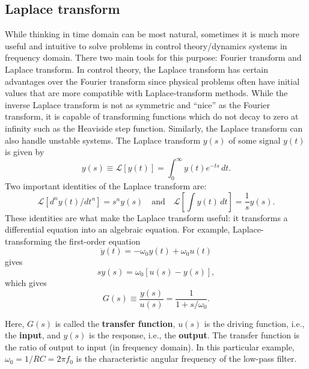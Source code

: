 \documentclass{book}
\theoremstyle{definition}
\newcommand{\lag}{\mathcal{L}}
\newcommand{\f}[2]{\frac{#1}{#2}}
\newcommand{\lb}{\left[}
\newcommand{\rb}{\right]}
\begin{document}
\subsection*{Laplace transform}


While thinking in time domain can be most natural, sometimes it is much more useful and intuitive to solve problems in control theory/dynamics systems in frequency domain. There two main tools for this purpose: Fourier transform and Laplace transform. In control theory, the Laplace transform has certain advantages over the Fourier transform since physical problems often have initial values that are more compatible with Laplace-transform methods. While the inverse Laplace transform is not as symmetric and ``nice'' as the Fourier transform, it is capable of transforming functions which do not decay to zero at infinity such as the Heaviside step function. Similarly, the Laplace transform can also handle unstable systems. The Laplace transform $y(s)$ of some signal $y(t)$ is given by 
\begin{equation*}
y(s) \equiv \lag[y(t)] = \int^\infty_0 y(t)e^{-ts}\,dt.
\end{equation*}
Two important identities of the Laplace transform are:
\begin{equation*}
\lag[d^n y(t)/dt^n] = s^n y(s) \quad \text{and} \quad \lag\lb \int y(t)\,dt \rb = \f{1}{s}y(s).
\end{equation*}
These identities are what make the Laplace transform useful: it transforms a differential equation into an algebraic equation. For example, Laplace-transforming the first-order equation
\begin{equation*}
\dot{y}(t) = -\omega_0 y(t) + \omega_0 u(t)
\end{equation*}
gives
\begin{equation*}
sy(s) = \omega_0 [ u(s) - y(s)],
\end{equation*}
which gives
\begin{equation*}
G(s) \equiv \f{y(s)}{u(s)} = \f{1}{1+ s/\omega_0}.
\end{equation*}

Here, $G(s)$ is called the \textbf{transfer function}, $u(s)$ is the driving function, i.e., the \textbf{input}, and $y(s)$ is the response, i.e., the \textbf{output}. The transfer function is the ratio of output to input (in frequency domain). In this particular example, $\omega_0 = 1/RC = 2\pi f_0$ is the characteristic angular frequency of the low-pass filter. \\
\end{document}
